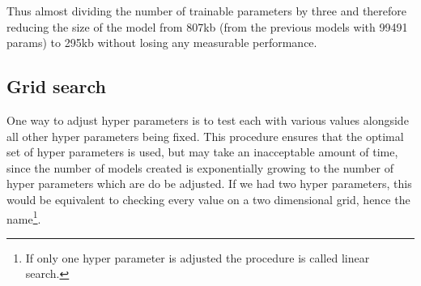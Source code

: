 Thus almost dividing the number of trainable parameters by three and therefore reducing the size of the model from 807kb (from the previous models with 99491 params) to 295kb without losing any measurable performance.

\subsection{Grid search}
One way to adjust hyper parameters is to test each with various values alongside all other hyper parameters being fixed.
This procedure ensures that the optimal set of hyper parameters is used, but may take an inacceptable amount of time, since the number of models created is exponentially growing to the number of hyper parameters which are do be adjusted.
If we had two hyper parameters, this would be equivalent to checking every value on a two dimensional grid, hence the name\footnote{If only one hyper parameter is adjusted the procedure is called linear search.}.
